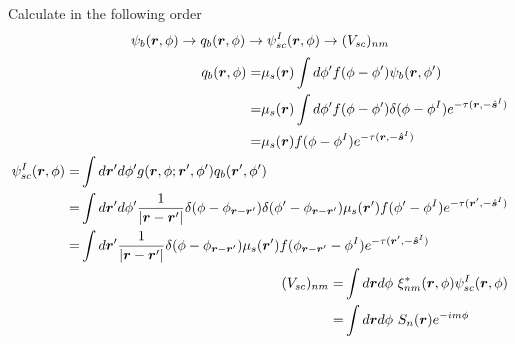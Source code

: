 \documentclass [10pt,letterpaper]{article}
\renewcommand{\vec}{\vectorsym}
\newcommand{\unitvec}[1]{\hat{\vec{#1}}}
\begin{document}
Calculate in the following order
\begin{equation} \label{eq:order-in-which-Vscnm-1pt-is-calculated}
	\psi_b(\vec{r},\phi)
	\to
	q_b(\vec{r},\phi)
	\to
	\psi_{sc}^I(\vec{r},\phi)
	\to
	(V_{sc})_{n m}
\end{equation}
\begin{subequations} \label{eq:result-qb-psiscI-2d-der-Vscnm-1pt}
	\begin{align}
		\begin{split}
			q_b(\vec{r},\phi)
			=&
			\mu_s(\vec{r})
			\int d\phi^\prime
			f(\phi-\phi^\prime)
			\psi_b(\vec{r},\phi^\prime) 
			\\
			=&
			\mu_s(\vec{r})
			\int d\phi^\prime
			f(\phi-\phi^\prime)
			\delta(\phi-\phi^I)
			e^{-\tau(\vec{r},-\unitvec{s}^I)} 
			\\
			=&
			\mu_s(\vec{r})
			f(\phi-\phi^I)
			e^{-\tau(\vec{r},-\unitvec{s}^I)} 
		\end{split}
		\label{eq:result-qb-2d}
		\\
		\begin{split}
			\psi_{sc}^I(\vec{r},\phi)
			=&
			\int d\vec{r}^\prime d\phi^\prime
			g(\vec{r},\phi;\vec{r}^\prime,\phi^\prime)
			q_b(\vec{r}^\prime,\phi^\prime)
			\\
			=&
			\int d\vec{r}^\prime d\phi^\prime
			\frac
			{1}
			{\lvert \vec{r}-\vec{r}^\prime \rvert}
			\delta(\phi-\phi_{\vec{r}-\vec{r}^\prime})
			\delta(\phi^\prime-\phi_{\vec{r}-\vec{r}^\prime})
			\mu_s(\vec{r}^\prime)
			f(\phi^\prime-\phi^I)
			e^{-\tau(\vec{r}^\prime,-\unitvec{s}^I)} 
			\\
			=& 
			\int d\vec{r}^\prime
			\frac
			{1}
			{\lvert \vec{r}-\vec{r}^\prime \rvert}
			\delta(\phi-\phi_{\vec{r}-\vec{r}^\prime})
			\mu_s(\vec{r}^\prime)
			f(\phi_{\vec{r}-\vec{r}^\prime}-\phi^I)
			e^{-\tau(\vec{r}^\prime,-\unitvec{s}^I)} 
		\end{split}
		\label{eq:result-psiscI-2d}
		\\
		\begin{split}
			(V_{sc})_{n m}
			=&
			\int d\vec{r} d\phi
			\ \xi^*_{n m}(\vec{r},\phi)
			\psi_{sc}^I(\vec{r},\phi)
			\\
			=&
			\int d\vec{r} d\phi
			\ S_n(\vec{r})
			e^{-i m \phi}

\end{split}
\end{align}
\end{subequations}
\end{document}
